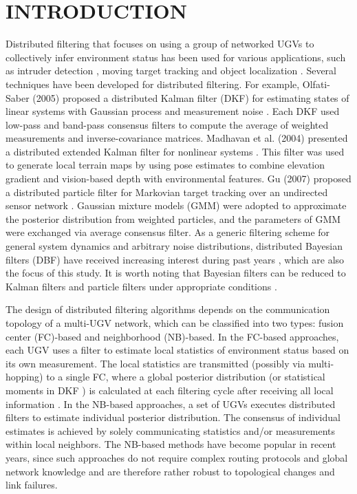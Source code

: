 \documentclass[journal]{IEEEtranTIE}
\theoremstyle{remark}
\begin{document}
	\section{INTRODUCTION}
	Distributed filtering that focuses on using a group of networked UGVs to collectively infer environment status has been used for various applications, such as intruder detection \cite{chamberland2007wireless}, moving target tracking \cite{wang2012cooperative} and object localization \cite{song2012mobile}. 
	Several techniques have been developed for distributed filtering.
	For example, Olfati-Saber (2005) proposed a distributed Kalman filter (DKF) for estimating states of linear systems with Gaussian process and measurement noise \cite{2005distributed}.
	Each DKF used low-pass and band-pass consensus filters to compute the average of weighted measurements and inverse-covariance matrices.
	Madhavan et al. (2004) presented a distributed extended Kalman filter for nonlinear systems \cite{madhavan2004distributed}.
	This filter was used to generate local terrain maps by using pose estimates to combine elevation gradient and vision-based depth with environmental features.
	Gu (2007) proposed a distributed particle filter for Markovian target tracking over an undirected sensor network \cite{gu2007distributed}. 
	Gaussian mixture models (GMM) were adopted to approximate the posterior distribution from weighted particles, and the parameters of GMM were exchanged via average consensus filter.
	As a generic filtering scheme for general system dynamics and arbitrary noise distributions, distributed Bayesian filters (DBF) have received increasing interest during past years \cite{bandyopadhyay2014distributed,julian2012distributed}, which are also the focus of this study.
	It is worth noting that Bayesian filters can be reduced to Kalman filters and particle filters under appropriate conditions \cite{chen2003bayesian}.
	
	The design of distributed filtering algorithms depends on the communication topology of a multi-UGV network, which can be classified into two types: fusion center (FC)-based and neighborhood (NB)-based.
	In the FC-based approaches, each UGV uses a filter to estimate local statistics of environment status based on its own measurement.
	The local statistics are transmitted (possibly via multi-hopping) to a single FC, where a global posterior distribution (or statistical moments in DKF \cite{olfati2007consensus}) is calculated at each filtering cycle after receiving all local information \cite{zuo2006bandwidth,he2014networked}.
	In the NB-based approaches, a set of UGVs executes distributed filters to estimate individual posterior distribution. 
	The consensus of individual estimates is achieved by solely communicating statistics and/or measurements within local neighbors.
	The NB-based methods have become popular in recent years, since such approaches do not require complex routing protocols and global network knowledge and are therefore rather robust to topological changes and link failures.
	
\end{document}
